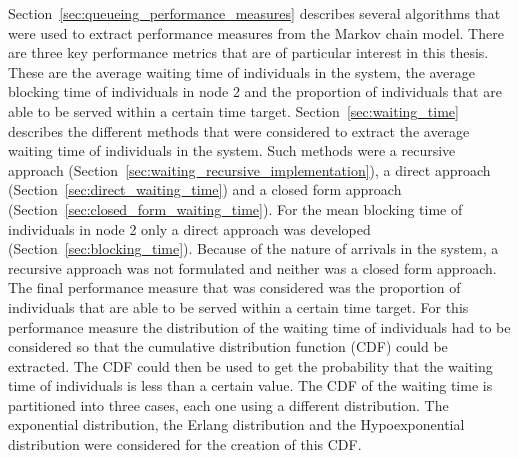 Section~\ref{sec:queueing_performance_measures} describes several algorithms
that were used to extract performance measures from the Markov chain model.
There are three key performance metrics that are of particular interest in this
thesis.
These are the average waiting time of individuals in the system, the average
blocking time of individuals in node 2 and the proportion of individuals that
are able to be served within a certain time target.
Section~\ref{sec:waiting_time} describes the different methods that were
considered to extract the average waiting time of individuals in the system.
Such methods were a recursive approach
(Section~\ref{sec:waiting_recursive_implementation}), a direct approach 
(Section~\ref{sec:direct_waiting_time}) and a closed form approach
(Section~\ref{sec:closed_form_waiting_time}).
For the mean blocking time of individuals in node 2 only a direct approach
was developed (Section~\ref{sec:blocking_time}).
Because of the nature of arrivals in the system, a recursive approach was not
formulated and neither was a closed form approach.
The final performance measure that was considered was the proportion of
individuals that are able to be served within a certain time target.
For this performance measure the distribution of the waiting time of
individuals had to be considered so that the cumulative distribution
function (CDF) could be extracted.
The CDF could then be used to get the probability that the waiting time of
individuals is less than a certain value.
The CDF of the waiting time is partitioned into three cases, each one using a
different distribution.
The exponential distribution, the Erlang distribution and the Hypoexponential
distribution were considered for the creation of this CDF.

